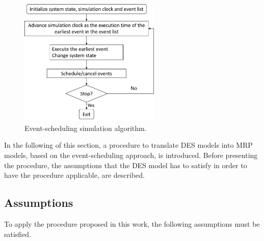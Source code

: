 \documentclass[]{interact}
\theoremstyle{plain}%
\theoremstyle{definition}
\theoremstyle{remark}
\begin{document}
\begin{figure}[h]
	\centering
	\includegraphics[width=0.6\textwidth]{Figures/EventSimAlgo.png}
	\caption{Event-scheduling simulation algorithm.}
	\label{Fig:SimAlgo}
\end{figure}

In the following of this section, a procedure to translate DES models into MRP models, based on the event-scheduling approach, is introduced. Before presenting the procedure, the assumptions that the DES model has to satisfy in order to have the procedure applicable, are described.

\subsection{Assumptions}

To apply the procedure proposed in this work, the following assumptions must be satisfied.
\end{document}
